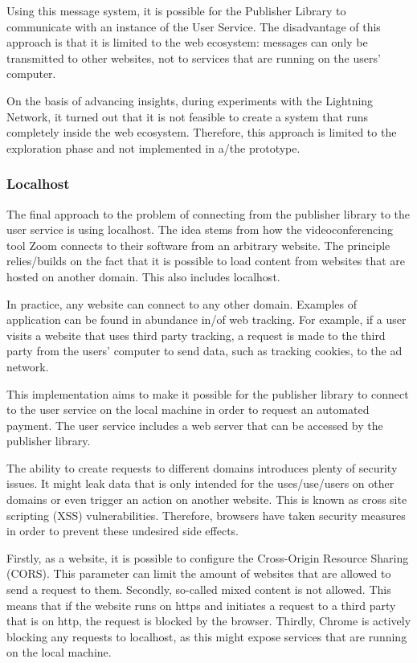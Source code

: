 Using this message system, it is possible for the Publisher Library to communicate with an instance of the User Service. The disadvantage of this approach is that it is limited to the web ecosystem: messages can only be transmitted to other websites, not to services that are running on the users' computer. 

On the basis of advancing insights, during experiments with the Lightning Network, it turned out that it is not feasible to create a system that runs completely inside the web ecosystem. Therefore, this approach is limited to the exploration phase and not implemented in a/the prototype.

\subsubsection{Localhost}
\label{sec:localhost}

The final approach to the problem of connecting from the publisher library to the user service is using localhost. The idea stems from how the videoconferencing tool Zoom connects to their software from an arbitrary website. The principle relies/builds on the fact that it is possible to load content from websites that are hosted on another domain. This also includes localhost.

In practice, any website can connect to any other domain. Examples of application can be found in abundance in/of web tracking. For example, if a user visits a website that uses third party tracking, a request is made to the third party from the users' computer to send data, such as tracking cookies, to the ad network. 

This implementation aims to make it possible for the publisher library to connect to the user service on the local machine in order to request an automated payment. The user service includes a web server that can be accessed by the publisher library. 

The ability to create requests to different domains introduces plenty of security issues. It might leak data that is only intended for the uses/use/users on other domains or even trigger an action on another website. This is known as cross site scripting (XSS) vulnerabilities. Therefore, browsers have taken security measures in order to prevent these undesired side effects.

Firstly, as a website, it is possible to configure the Cross-Origin Resource Sharing (CORS). This parameter can limit the amount of websites that are allowed to send a request to them. Secondly, so-called mixed content is not allowed. This means that if the website runs on https and initiates a request to a third party that is on http, the request is blocked by the browser. Thirdly, Chrome is actively blocking any requests to localhost, as this might expose services that are running on the local machine.


